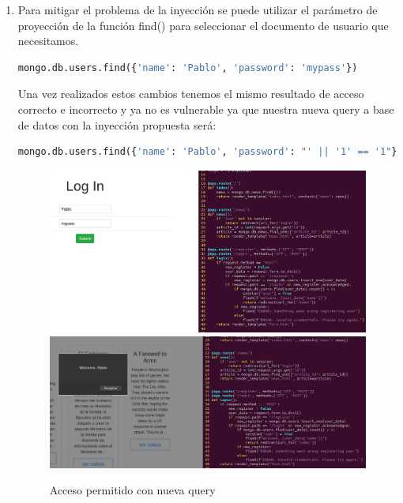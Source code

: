 \documentclass[a4paper,oneside]{article}
\begin{document}
\begin{enumerate}[label=\textbf{\alph*)}]
\item Para mitigar el problema de la inyección se puede utilizar el parámetro de proyección de la función find() para seleccionar el documento de usuario que necesitamos.
\begin{lstlisting}[caption={Query segura de búsqueda de documento en Mongo}, language=Python]
mongo.db.users.find({'name': 'Pablo', 'password': 'mypass'})
\end{lstlisting}



Una vez realizados estos cambios tenemos el mismo resultado de acceso correcto e incorrecto y ya no es vulnerable ya que nuestra nueva query a base de datos con la inyección propuesta será:
\begin{lstlisting}[language=Python, caption=Query a base de datos con parámetros de inyección]
mongo.db.users.find({'name': 'Pablo', 'password': "' || '1' == '1"})
\end{lstlisting}
\begin{figure}[h!]
  \centering
  \includegraphics[scale=0.3]{images/securenosql1.png}\\
  \vspace{1cm}
  \includegraphics[scale=0.3]{images/securenosql2.png}
  \caption{Acceso permitido con nueva query}
  \label{fig:secure_nosql}
\end{figure}


\end{enumerate}
\end{document}
